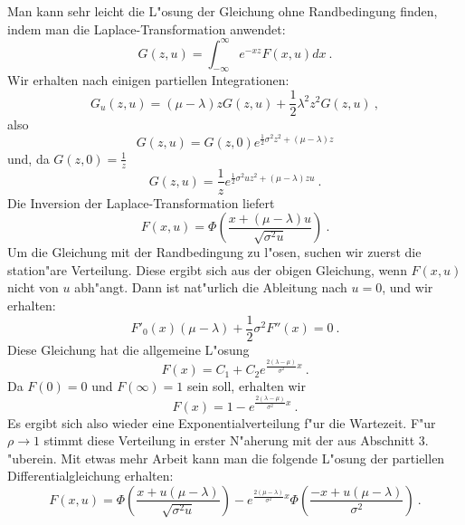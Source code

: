 \begin{enumerate}
Man kann sehr leicht die L"osung der Gleichung ohne Randbedingung finden, indem man die Laplace-Transformation anwendet:
\[G(z,u)=\int_{-\infty}^{\infty} e^{-xz}F(x,u)dx ~.\]
Wir erhalten nach einigen partiellen Integrationen:
\[G_{u}(z,u) = (\mu-\lambda)zG(z,u)+\frac{1}{2}\lambda^{2}z^{2}G(z,u) ~, \]
also
\[ G(z,u) = G(z,0)e^{\frac{1}{2}\sigma^{2}z^{2}+(\mu - \lambda)z}  \]
und, da $G(z,0)=\frac{1}{z}$
\[G(z,u) = \frac{1}{z}e^{\frac{1}{2}\sigma^{2}uz^{2}+(\mu - \lambda)zu} ~.\]
Die Inversion der Laplace-Transformation liefert
\[F(x,u)=\Phi\left(\frac{x+(\mu - \lambda)u}{\sqrt{\sigma^{2}u}}\right) ~.  \]
Um die Gleichung mit der Randbedingung zu l"osen, suchen wir zuerst die station"are Verteilung. Diese ergibt sich aus der obigen Gleichung, wenn $F(x,u)$ nicht
von $u$ abh"angt. Dann ist nat"urlich die Ableitung nach $u = 0$, und wir erhalten:
\[ F'_{0}(x)(\mu - \lambda)+\frac{1}{2}\sigma^{2}F''(x)=0 ~. \]
Diese Gleichung hat die allgemeine L"osung
\[F(x) = C_{1}+C_{2}e^{\frac{2(\lambda - \mu)}{\sigma^{2}}x} ~. \]
Da $F(0) = 0$ und $F(\infty) = 1$ sein soll, erhalten wir
\[F(x) = 1-e^{\frac{2(\lambda - \mu)}{\sigma^{2}}x} ~.  \]
Es ergibt sich also wieder eine Exponentialverteilung f"ur die Wartezeit. F"ur $\rho \rightarrow 1$ stimmt diese Verteilung in erster N"aherung mit der aus
Abschnitt $3.$ "uberein. Mit etwas mehr Arbeit kann man die folgende L"osung der partiellen Differentialgleichung erhalten:
\[F(x,u)=\Phi\left(\frac{x+u(\mu - \lambda)}{\sqrt{\sigma^{2}u}}\right)-e^{\frac{2(\mu - \lambda)}{\sigma^{2}}x}\Phi\left(\frac{-x+u(\mu -
\lambda)}{\sigma^{2}}\right) ~.\] 
\end {enumerate}
